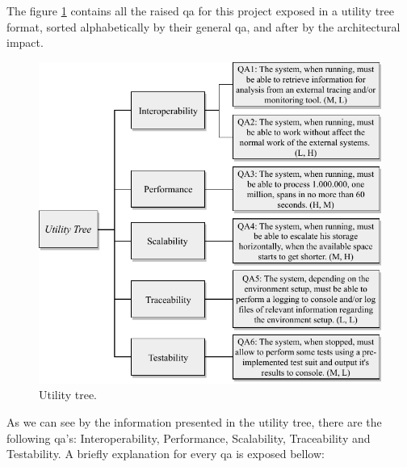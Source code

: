 The figure \ref{fig:utility_tree} contains all the raised \gls{qa} for this project exposed in a utility tree format, sorted alphabetically by their general \gls{qa}, and after by the architectural impact.

\begin{figure}[!ht]
    \centering
    \includegraphics[width=1.00\textwidth]{images/utility_tree.pdf}
    \caption{Utility tree.}
    \label{fig:utility_tree}
\end{figure}

As we can see by the information presented in the utility tree, there are the following \gls{qa}'s: Interoperability, Performance, Scalability, Traceability and Testability. A briefly explanation for every \gls{qa} is exposed bellow:

